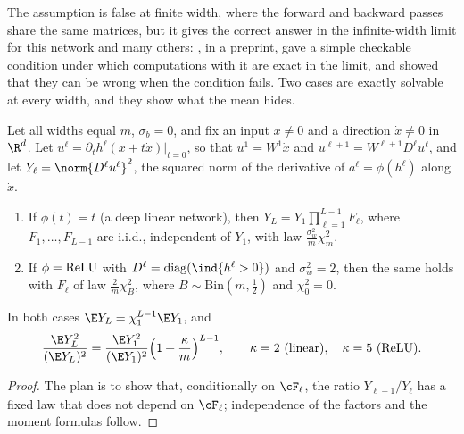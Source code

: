 \begin{refsection}
The assumption is false at finite width, where the forward and backward passes share the same matrices, but it gives the correct answer in the infinite-width limit for this network and many others: \textcite{Yang2020}, in a preprint, gave a simple checkable condition under which computations with it are exact in the limit, and showed that they can be wrong when the condition fails. Two cases are exactly solvable at every width, and they show what the mean hides.

\begin{theorem}\label{thm:signalprop:finite}
Let all widths equal $m$, $\sigma_b=0$, and fix an input $x\ne0$ and a direction $\dot x\ne0$ in $\R^d$. Let $u^\ell=\partial_th^\ell(x+t\dot x)|_{t=0}$, so that $u^1=W^1\dot x$ and $u^{\ell+1}=W^{\ell+1}D^\ell u^\ell$, and let $Y_\ell=\norm{D^\ell u^\ell}^2$, the squared norm of the derivative of $a^\ell=\phi(h^\ell)$ along $\dot x$.
\begin{enumerate}
\item If $\phi(t)=t$ (a deep linear network), then $Y_L=Y_1\prod_{\ell=1}^{L-1}F_\ell$, where $F_1,\dots,F_{L-1}$ are i.i.d., independent of $Y_1$, with law $\frac{\sigma_w^2}m\chi^2_m$.
\item If $\phi=\operatorname{ReLU}$ with $D^\ell=\diag(\ind\{h^\ell>0\})$ and $\sigma_w^2=2$, then the same holds with $F_\ell$ of law $\frac2m\chi^2_{B}$, where $B\sim\mathrm{Bin}(m,\frac12)$ and $\chi^2_0=0$.
\end{enumerate}
In both cases $\E Y_L=\chi_1^{L-1}\E Y_1$, and
\[
  \frac{\E Y_L^2}{(\E Y_L)^2}=\frac{\E Y_1^2}{(\E Y_1)^2}\Bigl(1+\frac\kappa m\Bigr)^{L-1},\qquad \kappa=2\ \text{(linear)},\quad \kappa=5\ \text{(ReLU)}.
\]
\end{theorem}

\begin{proof}
The plan is to show that, conditionally on $\cF_\ell$, the ratio $Y_{\ell+1}/Y_\ell$ has a fixed law that does not depend on $\cF_\ell$; independence of the factors and the moment formulas follow.


\end{proof}
\end{refsection}
